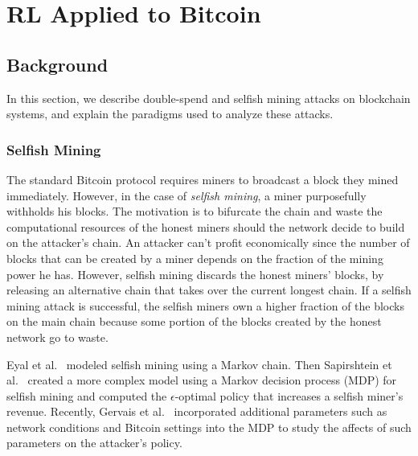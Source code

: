 \chapter{RL Applied to Bitcoin}\label{selfishRL}

\section{Background}
In this section, we describe double-spend and selfish mining attacks on blockchain systems, and explain the paradigms used to analyze these attacks.

\subsection{Selfish Mining}

The standard Bitcoin protocol requires miners to broadcast a block they mined immediately. However, in the case of {\em selfish mining}, a miner purposefully withholds his blocks. The motivation is to bifurcate the chain and waste the computational resources of the honest miners should the network decide to build on the attacker's chain. An attacker can't profit economically since the number of blocks that can be created by a miner depends on the fraction of the mining power he has. However, selfish mining discards the honest miners' blocks, by releasing an alternative chain that takes over the current longest chain. If a selfish mining attack is successful, the selfish miners own a higher fraction of the blocks on the main chain because some portion of the blocks created by the honest network go to waste.

Eyal et al.~\cite{eyal:2014} modeled selfish mining using a Markov chain. Then Sapirshtein et al.~\cite{sapirshtein:2015} created a more complex model using a Markov decision process (MDP) for selfish mining and computed the $\epsilon$-optimal policy that increases a selfish miner's revenue. Recently, Gervais et al.~\cite{Gervais:2016} incorporated additional parameters such as network conditions and Bitcoin settings into the MDP to study the affects of such parameters on the attacker's policy. %

